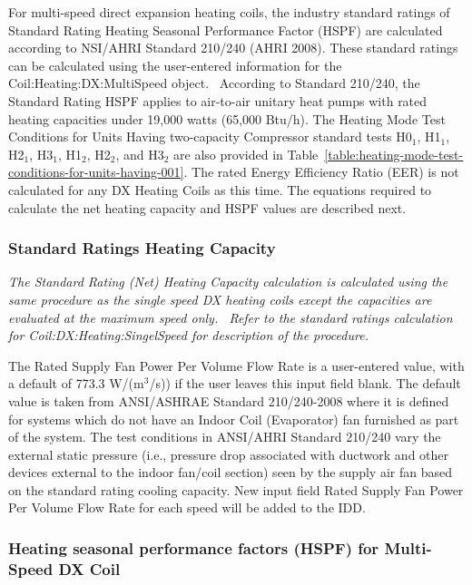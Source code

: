 For multi-speed direct expansion heating coils, the industry standard ratings of Standard Rating Heating Seasonal Performance Factor (HSPF) are calculated according to NSI/AHRI Standard 210/240 (AHRI 2008). These standard ratings can be calculated using the user-entered information for the Coil:Heating:DX:MultiSpeed object.~ According to Standard 210/240, the Standard Rating HSPF applies to air-to-air unitary heat pumps with rated heating capacities under 19,000 watts (65,000 Btu/h). The Heating Mode Test Conditions for Units Having two-capacity Compressor standard tests H0\(_{1}\), H1\(_{1}\), H2\(_{1}\), H3\(_{1}\), H1\(_{2}\), H2\(_{2}\), and H3\(_{2}\) are also provided in Table~\ref{table:heating-mode-test-conditions-for-units-having-001}. The rated Energy Efficiency Ratio (EER) is not calculated for any DX Heating Coils as this time. The equations required to calculate the net heating capacity and HSPF values are described next.

\subsubsection{Standard Ratings Heating Capacity}\label{standard-ratings-heating-capacity}

\emph{The Standard Rating (Net) Heating Capacity calculation is calculated using the same procedure as the single speed DX heating coils except the capacities are evaluated at the maximum speed only.~ Refer to the standard ratings calculation for Coil:DX:Heating:SingelSpeed for description of the procedure.}

The Rated Supply Fan Power Per Volume Flow Rate is a user-entered value, with a default of 773.3 W/(m\(^{3}\)/s)) if the user leaves this input field blank. The default value is taken from ANSI/ASHRAE Standard 210/240-2008 where it is defined for systems which do not have an Indoor Coil (Evaporator) fan furnished as part of the system. The test conditions in ANSI/AHRI Standard 210/240 vary the external static pressure (i.e., pressure drop associated with ductwork and other devices external to the indoor fan/coil section) seen by the supply air fan based on the standard rating cooling capacity. New input field Rated Supply Fan Power Per Volume Flow Rate for each speed will be added to the IDD.

\subsubsection{Heating seasonal performance factors (HSPF) for Multi-Speed DX Coil}\label{heating-seasonal-performance-factors-hspf-for-multi-speed-dx-coil}

